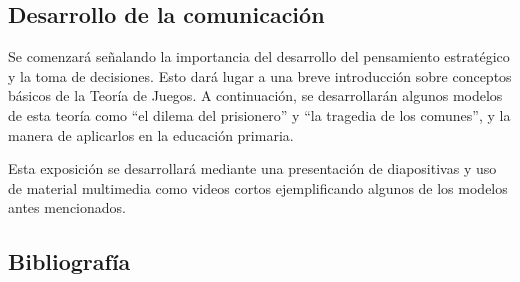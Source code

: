\subsection{Desarrollo de la comunicación}

Se comenzará señalando la importancia del desarrollo del pensamiento estratégico y la toma de decisiones. Esto dará lugar a una breve introducción sobre conceptos básicos de la Teoría de Juegos. A continuación, se desarrollarán algunos modelos de esta teoría como “el dilema del prisionero” y “la tragedia de los comunes”, y la manera de aplicarlos en la educación primaria.

Esta exposición se desarrollará mediante una presentación de diapositivas y uso de material multimedia como videos cortos ejemplificando algunos de los modelos antes mencionados.

\subsection{Bibliografía}

\nocite{*}
\printbibliography[keyword={09}]